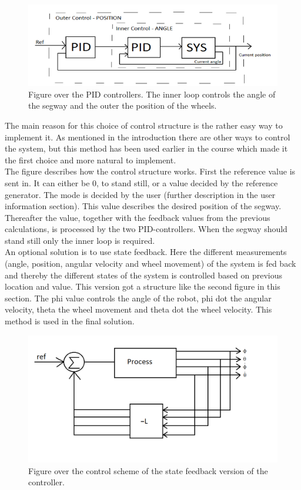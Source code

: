 \documentclass[a4paper]{article}
\begin{document}
\begin{figure}[H]
  \centering
\includegraphics[scale=0.8]{pic/PIDs.png}
\caption{Figure over the PID controllers. The inner loop controls the angle of the segway and the outer the position of the wheels.}
\end{figure}

The main reason for this choice of control structure is the rather easy way to implement it. As mentioned in the introduction there are other ways to control the system, but this method has been used earlier in the course which made it the first choice and more natural to implement. \\

The figure describes how the control structure works. First the reference value is sent in. It can either be 0, to stand still, or a value decided by the reference generator. The mode is decided by the user (further description in the user information section). This value describes the desired position of the segway. Thereafter the value, together with the feedback values from the previous calculations, is processed by the two PID-controllers. When the segway should stand still only the inner loop is required. \\

An optional solution is to use state feedback. Here the different measurements (angle, position, angular velocity and wheel movement) of the system is fed back and thereby the different states of the system is controlled based on previous location and value. This version got a structure like the second figure in this section. The phi value controls the angle of the robot, phi dot the angular velocity, theta the wheel movement and theta dot the wheel velocity. This method is used in the final solution.\\

\begin{figure}[H]
 \centering
\includegraphics[scale=0.5]{pic/Statefeedback.png}
\caption{Figure over the control scheme of the state feedback version of the controller.}
\end{figure}
\end{document}

